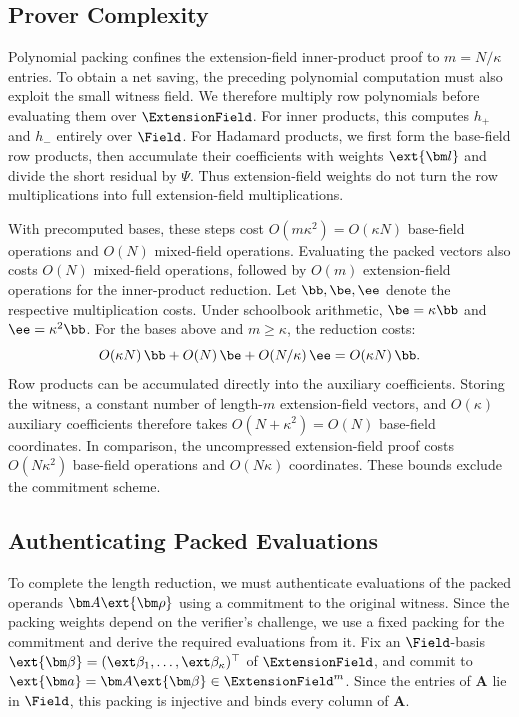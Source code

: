 \subsection{Prover Complexity}
\label{sec:highLevelEfficiency}

Polynomial packing confines the extension-field inner-product proof
to \(m=N/\kappa\) entries. To obtain a net saving, the preceding
polynomial computation must also exploit the small witness field.
We therefore multiply row polynomials before evaluating them over
\(\ExtensionField\).
For inner products, this computes \(h_+\) and \(h_-\) entirely over
\(\Field\). For Hadamard products, we first form the base-field row
products, then accumulate their coefficients with weights
\(\ext{\bm l}\) and divide the short residual by \(\Psi\).
Thus extension-field weights do not turn the row multiplications
into full extension-field multiplications.

With precomputed bases, these steps cost
\(O(m\kappa^2)=O(\kappa N)\) base-field operations and \(O(N)\)
mixed-field operations. Evaluating the packed vectors also costs
\(O(N)\) mixed-field operations, followed by \(O(m)\) extension-field
operations for the inner-product reduction.
Let \(\bb,\be,\ee\) denote the respective multiplication costs.
Under schoolbook arithmetic,
\(\be=\kappa\bb\) and \(\ee=\kappa^2\bb\).
For the bases above and \(m\geq\kappa\), the reduction costs:
\[
    O(\kappa N)\,\bb+O(N)\,\be+O(N/\kappa)\,\ee
    =O(\kappa N)\,\bb.
\]
Row products can be accumulated directly into the auxiliary
coefficients. Storing the witness, a constant number of length-\(m\)
extension-field vectors, and \(O(\kappa)\) auxiliary coefficients
therefore takes \(O(N+\kappa^2)=O(N)\) base-field coordinates.
In comparison, the uncompressed extension-field proof costs
\(O(N\kappa^2)\) base-field operations and \(O(N\kappa)\) coordinates.
These bounds exclude the commitment scheme.

\subsection{Authenticating Packed Evaluations}
\label{sec:highlevelPCS}

To complete the length reduction, we must authenticate evaluations of
the packed operands \(\bm A\ext{\bm\rho}\) using a commitment to
the original witness. Since the packing weights depend on the verifier's
challenge, we use a fixed packing for the commitment and derive the
required evaluations from it.
Fix an \(\Field\)-basis
\(\ext{\bm\beta}=(\ext\beta_1,\ldots,\ext\beta_\kappa)^\top\)
of \(\ExtensionField\), and commit to
\(\ext{\bm a}=\bm A\ext{\bm\beta}\in\ExtensionField^m\).
Since the entries of \(\bm A\) lie in \(\Field\), this packing is
injective and binds every column of \(\bm A\).

